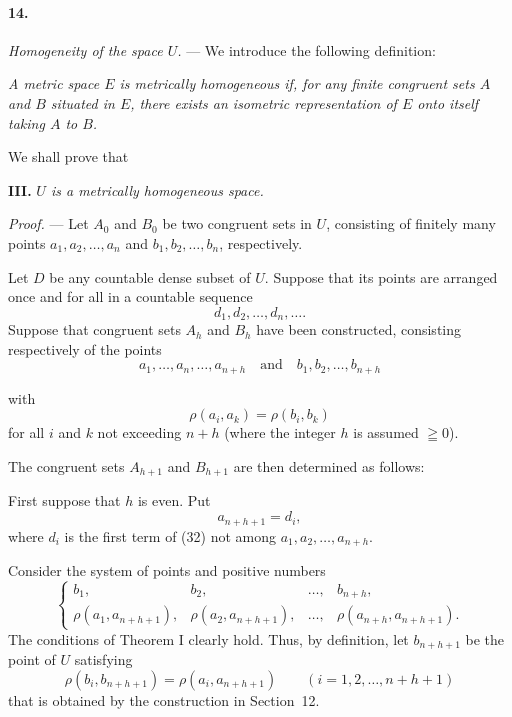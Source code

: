 \documentclass[a4paper,12pt]{amsart}
\newcommand{\srcpage}[1]{} %
\begin{document}
\paragraph{14.}
\textit{Homogeneity of the space $U$.} --- We introduce the following definition:

\textit{A metric space $E$ is metrically homogeneous if, for any finite congruent sets $A$ and $B$ situated in $E$, there exists an isometric representation of $E$ onto itself taking $A$ to $B$.}

We shall prove that

\textbf{III.} \textit{$U$ is a metrically homogeneous space.}

\textit{Proof.} --- Let $A_0$ and $B_0$ be two congruent sets in $U$, consisting of finitely many points $a_1,a_2,\dots,a_n$ and $b_1,b_2,\dots,b_n$, respectively.

Let $D$ be any countable dense subset of $U$. Suppose that its points are arranged once and for all in a countable sequence
\begin{equation}\tag{33}
d_1,d_2,\dots,d_n,\dots.
\end{equation}
Suppose that congruent sets $A_h$ and $B_h$ have been constructed, consisting respectively of the points
\[
a_1,\dots,a_n,\dots,a_{n+h}\quad\text{and}\quad b_1,b_2,\dots,b_{n+h}
\]
\srcpage{75}
with
\[
\rho(a_i,a_k)=\rho(b_i,b_k)
\]
for all $i$ and $k$ not exceeding $n+h$ (where the integer $h$ is assumed $\geqq0$).

The congruent sets $A_{h+1}$ and $B_{h+1}$ are then determined as follows:

First suppose that $h$ is even. Put
\[
a_{n+h+1}=d_i,
\]
where $d_i$ is the first term of (32) not among $a_1,a_2,\dots,a_{n+h}$.

Consider the system of points and positive numbers
\begin{equation}\tag{33 a}
\left\{\begin{array}{cccc}
b_1,&b_2,&\dots,&b_{n+h},\\
\rho(a_1,a_{n+h+1}),&\rho(a_2,a_{n+h+1}),&\dots,&\rho(a_{n+h},a_{n+h+1}).
\end{array}\right.
\end{equation}
The conditions of Theorem I clearly hold. Thus, by definition, let $b_{n+h+1}$ be the point of $U$ satisfying
\[
\rho(b_i,b_{n+h+1})=\rho(a_i,a_{n+h+1})\qquad(i=1,2,\dots,n+h+1)
\]
that is obtained by the construction in Section~12.
\end{document}
